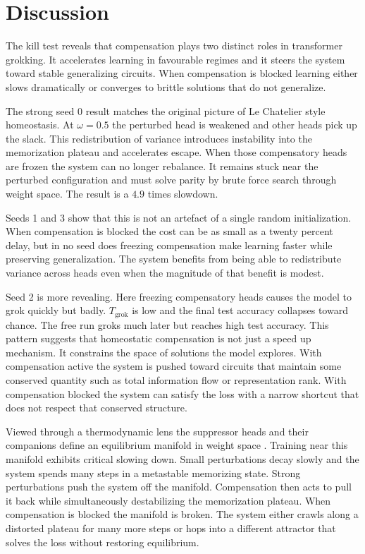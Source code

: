 \section{Discussion}

The kill test reveals that compensation plays two distinct roles in transformer grokking. It accelerates learning in favourable regimes and it steers the system toward stable generalizing circuits. When compensation is blocked learning either slows dramatically or converges to brittle solutions that do not generalize.

The strong seed 0 result matches the original picture of Le Chatelier style homeostasis. At $\omega = 0.5$ the perturbed head is weakened and other heads pick up the slack. This redistribution of variance introduces instability into the memorization plateau and accelerates escape. When those compensatory heads are frozen the system can no longer rebalance. It remains stuck near the perturbed configuration and must solve parity by brute force search through weight space. The result is a $4.9$ times slowdown.

Seeds 1 and 3 show that this is not an artefact of a single random initialization. When compensation is blocked the cost can be as small as a twenty percent delay, but in no seed does freezing compensation make learning faster while preserving generalization. The system benefits from being able to redistribute variance across heads even when the magnitude of that benefit is modest.

Seed 2 is more revealing. Here freezing compensatory heads causes the model to grok quickly but badly. $T_{\text{grok}}$ is low and the final test accuracy collapses toward chance. The free run groks much later but reaches high test accuracy. This pattern suggests that homeostatic compensation is not just a speed up mechanism. It constrains the space of solutions the model explores. With compensation active the system is pushed toward circuits that maintain some conserved quantity such as total information flow or representation rank. With compensation blocked the system can satisfy the loss with a narrow shortcut that does not respect that conserved structure.

Viewed through a thermodynamic lens the suppressor heads and their companions define an equilibrium manifold in weight space \cite{kringelbach2024thermodynamics}. Training near this manifold exhibits critical slowing down. Small perturbations decay slowly and the system spends many steps in a metastable memorizing state. Strong perturbations push the system off the manifold. Compensation then acts to pull it back while simultaneously destabilizing the memorization plateau. When compensation is blocked the manifold is broken. The system either crawls along a distorted plateau for many more steps or hops into a different attractor that solves the loss without restoring equilibrium.
